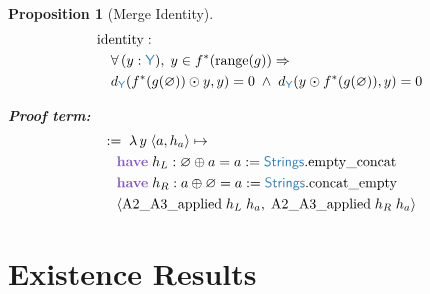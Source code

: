 \documentclass[11pt]{article}
\theoremstyle{definition}
\theoremstyle{plain}
\newtheorem{propenv}{Proposition}
\newcommand{\kw}[1]{\textcolor{keyword}{\textbf{#1}}}
\newcommand{\ty}[1]{\textcolor{type}{\mathsf{#1}}}
\newcommand{\fn}[1]{\mathrm{#1}}
\newcommand{\lam}{\lambda\,}
\newcommand{\all}{\forall\,}
\newcommand{\Arr}{\Rightarrow}
\newcommand{\pf}{:=\;}
\newcommand{\Strings}{\ty{Strings}}
\newcommand{\Y}{\ty{Y}}
\newcommand{\fstar}{f^*}
\newcommand{\dY}{d_{\Y}}
\newcommand{\concat}{\oplus}
\newcommand{\emptystr}{\varnothing}
\begin{document}
\begin{propenv}[Merge Identity]
\label{prop:identity}
\begin{align*}
&\fn{identity} : \\
&\quad \all (y : \Y),\; y \in \fstar(\fn{range}(g)) \Arr \\
&\quad \dY(\fstar(g(\emptystr)) \odot y, y) = 0 \;\land\; \dY(y \odot \fstar(g(\emptystr)), y) = 0
\end{align*}

\textbf{Proof term:}
\begin{align*}
&\pf \lam y\; \langle a, h_a \rangle \mapsto \\
&\quad \kw{have}\; h_L : \emptystr \concat a = a := \Strings.\fn{empty\_concat} \\
&\quad \kw{have}\; h_R : a \concat \emptystr = a := \Strings.\fn{concat\_empty} \\
&\quad \langle \fn{A2\_A3\_applied}\; h_L\; h_a,\; \fn{A2\_A3\_applied}\; h_R\; h_a \rangle
\end{align*}
\end{propenv}

\section{Existence Results}
\label{sec:existence}
\end{document}
